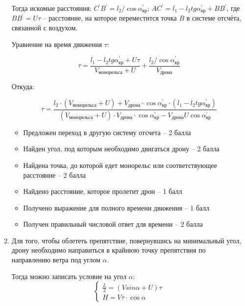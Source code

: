 \begin{enumerate}

    Тогда искомые расстояния: $C^\prime B^\prime=  l_2/\cos \alpha_\text{кр}^\prime$; $AC^\prime= l_1-l_2  tg\alpha_\text{кр}^\prime+BB^\prime$, где $BB^\prime=U\tau$  – расстояние, на которое переместится точка $B$ в системе отсчёта, связанной с воздухом.

    Уравнение на время движения $\tau$:
    
    $$\tau =\frac{l_1-l_2  tg\alpha_\text{кр}^\prime+U\tau}{V_\text{монорельса}+U}+\frac{l_2/\cos\alpha_\text{кр}^\prime}{V_\text{дрона}}$$
    
    Откуда: 

    $$ \tau =\frac{l_2 \cdot (V_\text{монорельса}+U)+V_\text{дрона} \cdot \cos\alpha_\text{кр}^\prime \cdot (l_1-l_2  tg\alpha_\text{кр}^\prime)}{(V_\text{монорельса}+U) \cdot V_\text{дрона} \cdot \cos\alpha_\text{кр}^\prime-V_\text{дрона} U \cos\alpha_\text{кр}^\prime}$$


    \markSection

    \begin{itemize}
        \item Предложен переход в другую систему отсчета – 2 балла
        \item Найден угол, под которым необходимо двигаться дрону – 2 балла
        \item Найдена точка, до которой едет монорельс или соответствующее расстояние – 2 балла
        \item Найдено расстояние, которое пролетит дрон – 1 балл
        \item Получено выражение для полного времени движения – 1 балл
        \item Получен правильный числовой ответ для времени – 2 балла
    \end{itemize}

    \item Для того, чтобы облететь препятствие, повернувшись на минимальный угол, дрону необходимо направиться в крайнюю точку препятствия по направлению ветра под углом $\alpha$.
    
    Тогда можно записать условие на угол $\alpha$:
    $$ \left\{
        \begin{aligned}
            \frac{L}{2}=(V sin\alpha +U)\tau\\ 
            H=V \tau  \cdot \cos\alpha
        \end{aligned}
    \right. $$


\end{enumerate}
